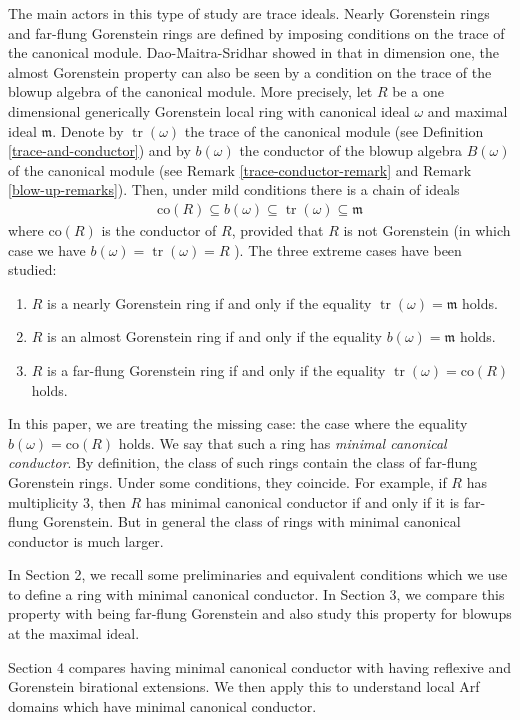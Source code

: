 \documentclass[12pt]{amsart}
\newcommand\co{\mathrm{co}}
\newcommand{\m}{\mathfrak{m}}
\theoremstyle{definition}
\DeclareMathOperator{\tr}{\mathrm{tr}}
\begin{document}
The main actors in this type of study are trace ideals. Nearly Gorenstein rings and far-flung Gorenstein rings are defined by imposing conditions on the trace of the canonical module. Dao-Maitra-Sridhar showed in \cite[Proposition 7.1]{Dao-Maitra-Sridhar} that in dimension one, the almost Gorenstein property can also be seen by a condition on the trace of the blowup algebra of the canonical module. More precisely, let $R$ be a one dimensional generically Gorenstein local ring with canonical ideal $\omega$ and maximal ideal $\m$. Denote by $\tr(\omega)$ the trace of the canonical module (see Definition \ref{trace-and-conductor}) and by $b(\omega)$ the conductor of the blowup algebra $B(\omega)$ of the canonical module (see Remark \ref{trace-conductor-remark} and Remark \ref{blow-up-remarks}). Then, under mild conditions there is a chain of ideals 
\begin{align*}
\co(R) \subseteq b(\omega) \subseteq \tr(\omega) \subseteq \m
\end{align*}
where $\co(R)$ is the conductor of $R$, provided that $R$ is not Gorenstein (in which case we have $b(\omega) = \tr(\omega) = R$ ). The three extreme cases have been studied:
\begin{enumerate}
    \item $R$ is a nearly Gorenstein ring if and only if the equality $\tr(\omega) = \m$ holds.
    \item $R$ is an almost Gorenstein ring if and only if the equality $b(\omega) = \m$ holds.
    \item $R$ is a far-flung Gorenstein ring if and only if the equality $\tr(\omega) = \co(R)$ holds.
\end{enumerate}
In this paper, we are treating the missing case: the case where the equality $b(\omega) = \co(R)$ holds. We say that such a ring has \textit{minimal canonical conductor}. By definition, the class of such rings contain the class of far-flung Gorenstein rings. Under some conditions, they coincide. For example, if $R$ has multiplicity 3, then $R$ has minimal canonical conductor if and only if it is far-flung Gorenstein. But in general the class of rings with minimal canonical conductor is much larger.

In Section 2, we recall some preliminaries and equivalent conditions which we use to define a ring with minimal canonical conductor. In Section 3, we compare this property with being far-flung Gorenstein and also study this property for blowups at the maximal ideal.

Section 4 compares having minimal canonical conductor with having reflexive and Gorenstein birational extensions. We then apply this to understand local Arf domains which have minimal canonical conductor.
\end{document}
